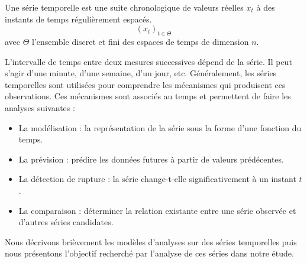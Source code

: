 \begin{definition}
Une s\'erie temporelle est une suite chronologique de valeurs r\'eelles $x_t$ \`a des instants de temps r\'eguli\`erement espac\'es. 
\begin{equation}
(x_t)_{ t \in \Theta}
\end{equation}
avec $\Theta $ l'ensemble discret et fini des espaces de temps de dimension $n$.
\end{definition}
L'intervalle de temps entre deux mesures successives d\'epend de la s\'erie. 
Il peut s'agir d'une minute, d'une semaine, d'un jour, etc.
G\'en\'eralement, les s\'eries temporelles sont utilis\'ees  pour comprendre les m\'ecanismes qui produisent ces observations. Ces m\'ecanismes sont associ\'es au temps et  permettent de faire les analyses suivantes :
\begin{itemize}
	\item La mod\'elisation : la repr\'esentation de la s\'erie sous la forme d'une fonction du temps.
	\item La pr\'evision : pr\'edire les donn\'ees futures \`a partir de valeurs pr\'ed\'ecentes.
	\item La d\'etection de rupture :  la s\'erie change-t-elle significativement \`a un instant $t$.
	\item La comparaison :  d\'eterminer la relation existante entre une s\'erie observ\'ee et d'autres s\'eries candidates.
\end{itemize}
Nous d\'ecrivons bri\`evement les mod\`eles d'analyses sur des s\'eries temporelles puis nous pr\'esentons l'objectif recherch\'e par l'analyse de ces s\'eries dans notre \'etude. 

